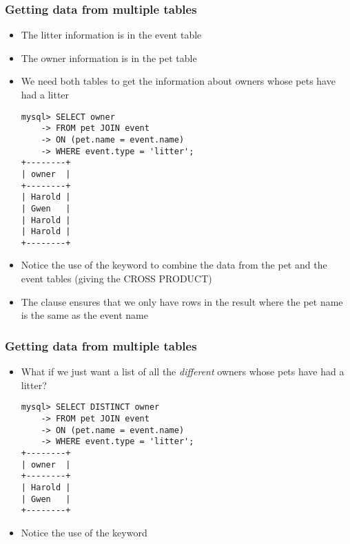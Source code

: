 \documentclass[hyperref={pdfpagelabels=false},svgnames,xcolor=table]{beamer}
\begin{document}
\begin{frame}[fragile]
  \frametitle{Getting data from multiple tables}
  \begin{itemize}
    \item The litter information is in the event table
    \item The owner information is in the pet table
    \item We need both tables to get the information about owners
      whose pets have had a litter
      \begin{scriptsize}
\begin{verbatim}
mysql> SELECT owner 
    -> FROM pet JOIN event 
    -> ON (pet.name = event.name) 
    -> WHERE event.type = 'litter';
+--------+
| owner  |
+--------+
| Harold |
| Gwen   |
| Harold |
| Harold |
+--------+
\end{verbatim}
      \end{scriptsize}
    \item Notice the use of the keyword {\color{blue}{JOIN}} to combine the
      data from the pet and the event tables (giving the 
      {\color{blue}{}CROSS PRODUCT})
    \item The {\color{blue}{ON}} clause ensures that we only have rows in
      the result where the pet name is the same as the event name
  \end{itemize}
\end{frame}

\begin{frame}[fragile]
  \frametitle{Getting data from multiple tables}
  \begin{itemize}
    \item What if we just want a list of all the \emph{different} 
      owners whose pets have had a litter?
      \begin{scriptsize}
\begin{verbatim}
mysql> SELECT DISTINCT owner 
    -> FROM pet JOIN event 
    -> ON (pet.name = event.name) 
    -> WHERE event.type = 'litter';
+--------+
| owner  |
+--------+
| Harold |
| Gwen   |
+--------+

\end{verbatim}
      \end{scriptsize}
    \item Notice the use of the keyword {\color{blue}{DISTINCT}}
  \end{itemize}
\end{frame}
\end{document}

